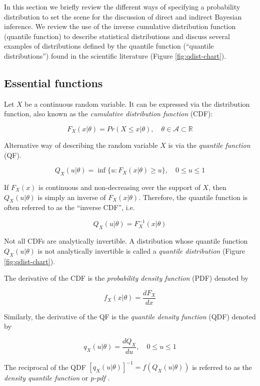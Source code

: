\documentclass[
  12pt,
]{article}
\begin{document}
In this section we briefly review the different ways of specifying a probability distribution to set the scene for the discussion of direct and indirect Bayesian inference. We review the use of the inverse cumulative distribution function (quantile function) to describe statistical distributions and discuss several examples of distributions defined by the quantile function (``quantile distributions'') found in the scientific literature (Figure \ref{fig:qdist-chart}).

\hypertarget{essential-functions}{%
\subsection{Essential functions}\label{essential-functions}}

Let \(X\) be a continuous random variable. It can be expressed via the distribution function, also known as the \emph{cumulative distribution function} (CDF):

\[
F_X(x | \theta)=Pr(X \leq x | \theta), \quad \theta \in \mathcal A \subset \mathbb R
\]

Alternative way of describing the random variable \(X\) is via the \emph{quantile function} (QF).

\[
Q_X(u | \theta)=\inf\{u:F_X(x|\theta)\geq u\}, \quad 0 \leq u\leq 1
\]

If \(F_X(x)\) is continuous and non-decreasing over the support of \(X\), then \(Q_X(u|\theta)\) is simply an inverse of \(F_X(x|\theta)\). Therefore, the quantile function is often referred to as the ``inverse CDF'', i.e.~

\[
Q_X(u | \theta)=F_X^{-1}(x|\theta)
\]

Not all CDFs are analytically invertible. A distribution whose quantile function \(Q_X(u | \theta)\) is not analytically invertible is called a \emph{quantile distribution} (Figure \ref{fig:qdist-chart}).

The derivative of the CDF is the \emph{probability density function} (PDF) denoted by

\[
f_X(x | \theta)=\frac{dF_X}{dx}
\]

Similarly, the derivative of the QF is the \emph{quantile density function} (QDF) denoted by

\[
q_X(u|\theta)=\frac{dQ_X}{du}, \quad 0 \leq u \leq 1
\]

The reciprocal of the QDF \([q_X(u|\theta)]^{-1}=f(Q_X(u|\theta))\) is referred to as the \emph{density quantile function} \citep{parzen1980DataModelingUsing} or \emph{p-pdf} \citep{gilchrist2000StatisticalModellingQuantile}.
\end{document}
